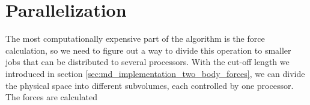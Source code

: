 \section{Parallelization}
The most computationally expensive part of the algorithm is the force calculation, so we need to figure out a way to divide this operation to smaller jobs that can be distributed to several processors. With the cut-off length we introduced in section \ref{sec:md_implementation_two_body_forces}, we can divide the physical space into different subvolumes, each controlled by one processor. The forces are calculated 